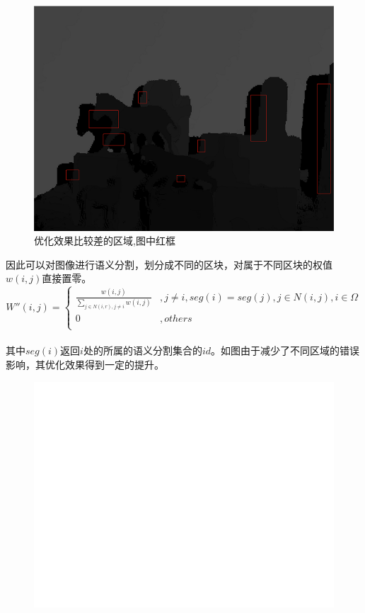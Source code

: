 \documentclass[UTF8]{ctexart}
\begin{document}
\begin{sloppypar}
    \begin{figure}[htbp]
        \centering
        \includegraphics[scale=0.4]{figure/badRegion.png}
        \caption{\small 优化效果比较差的区域,图中红框}
        \label{fig:colorize:badregion}
    \end{figure}
    因此可以对图像进行语义分割，划分成不同的区块，对属于不同区块的权值$w(i,j)$直接置零。
    \begin{equation}
        W''(i,j) = \left\{
        \begin{array}{cc}
            \frac{w(i,j)}{\sum\limits_{j\in N(i,r),j\neq i}w(i,j)}&,j \neq i,seg(i)=seg(j),j \in N(i,j), i\in \Omega  \\
            0&, others\\
        \end{array} \right.
        \label{con:Wseg}
    \end{equation}\\
    其中$seg(i)$返回$i$处的所属的语义分割集合的$id$。如图由于减少了不同区域的错误影响，其优化效果得到一定的提升。
    \begin{figure}[htbp]
        \begin{minipage}[t]{0.5\linewidth}
            \centering
            \includegraphics[scale=0.25]{figure/result_colorized_allregion_noseg.png}

\end{minipage}
\end{figure}
\end{sloppypar}
\end{document}
